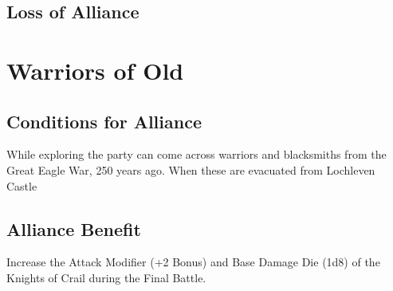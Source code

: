 \subsection*{Loss of Alliance}

\section*{Warriors of Old}\label{alliance:WarriorsOfOld}
\subsection*{Conditions for Alliance}
While exploring \hyperref[subsec:LochlevenCastle]{} the party can come across warriors and blacksmiths from the Great Eagle War, 250 years ago. When these are evacuated from Lochleven Castle
\subsection*{Alliance Benefit}
Increase the Attack Modifier (+2 Bonus) and Base Damage Die (1d8) of the Knights of Crail during the Final Battle.